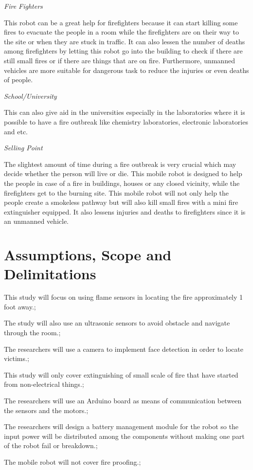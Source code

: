 \textit{Fire Fighters} \newline

	This robot can be a great help for firefighters because it can start killing some fires to evacuate the people in a room while the firefighters are on their way to the site or when they are stuck in traffic. It can also lessen the number of deaths among firefighters by letting this robot go into the building to check if there are still small fires or if there are things that are on fire. Furthermore, unmanned vehicles are more suitable for dangerous task to reduce the injuries or even deaths of people.

\textit{School/University} \newline

	This can also give aid in the universities especially in the laboratories where it is possible to have a fire outbreak like chemistry laboratories, electronic laboratories and etc. 

\textit{Selling Point} \newline

	The slightest amount of time during a fire outbreak is very crucial which may decide whether the person will live or die. This mobile robot is designed to help the people in case of a fire in buildings, houses or any closed vicinity, while the firefighters get to the burning site. This mobile robot will not only help the people create a smokeless pathway but will also kill small fires with a mini fire extinguisher equipped. It also lessens injuries and deaths to firefighters since it is an unmanned vehicle.

\section{Assumptions, Scope and Delimitations}

\begin{itemized}
	\item This study will focus on using flame sensors in locating the fire approximately 1 foot away.;
	\item The study will also use an ultrasonic sensors to avoid obstacle and navigate through the room.;
	\item The researchers will use a camera to implement face detection in order to locate victims.;
	\item This study will only cover extinguishing of small scale of fire that have started from non-electrical things.;
	\item The researchers will use an Arduino board as means of communication between the sensors and the motors.;
	\item The researchers will design a battery management module for the robot so the input power will be distributed among the components without making one part of the robot fail or breakdown.;
	\item The mobile robot will not cover fire proofing.;
\end{itemized}

